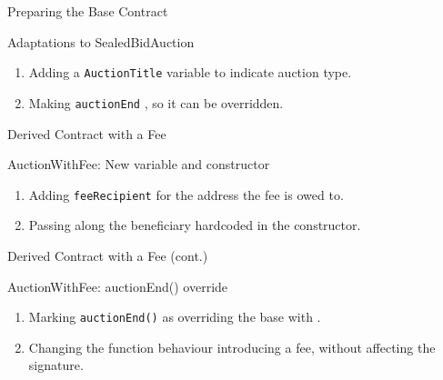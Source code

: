 \documentclass[handout]{beamer}
\begin{document}
\begin{frame}{Preparing the Base Contract}

\begin{samplecode}{Adaptations to SealedBidAuction}
	
\end{samplecode}
\begin{enumerate}
	\item	Adding a \texttt{AuctionTitle} variable to indicate auction type.
	\item	Making \texttt{auctionEnd} , so it can be overridden.
\end{enumerate}

\end{frame}

\begin{frame}{Derived Contract with a Fee}

\begin{samplecode}{AuctionWithFee: New variable and constructor}
	
\end{samplecode}
\begin{enumerate}
	\item	Adding \texttt{feeRecipient} for the address the fee is owed to.
	\item	Passing along the beneficiary hardcoded in the constructor.
\end{enumerate}

\end{frame}

\begin{frame}{Derived Contract with a Fee (cont.)}

\begin{samplecode}{AuctionWithFee: auctionEnd() override}
	
\end{samplecode}
\begin{enumerate}
	\item	Marking \texttt{auctionEnd()} as overriding the base with .
	\item	Changing the function behaviour introducing a fee, without affecting the signature.
\end{enumerate}

\end{frame}
\end{document}
